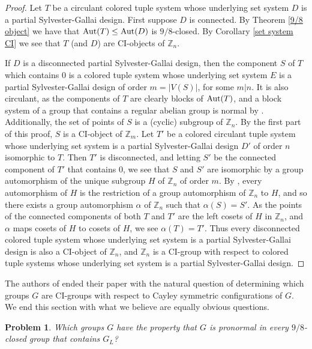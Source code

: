 \documentclass{amsart}
\newtheorem{problem}[thrm]{Problem}
\theoremstyle{definition}
\theoremstyle{remark}
\numberwithin{equation}{section}
\def\Z{{\mathbb Z}}
\def\Aut{{\rm Aut}}
\begin{document}
\begin{proof}
Let $T$ be a circulant colored tuple system whose underlying set system $D$ is a partial Sylvester-Gallai design.  First suppose $D$ is connected.  By Theorem \ref{9/8 object} we have that $\Aut(T)\le\Aut(D)$ is $9/8$-closed.  By Corollary \ref{set system CI} we see that $T$ (and $D$) are CI-objects of $\Z_n$.  %

If $D$ is a disconnected partial Sylvester-Gallai design, then the component $S$ of $T$ which contains $0$ is a colored tuple system whose underlying set system $E$ is a partial Sylvester-Gallai design of order $m = \vert V(S)\vert$, for some $m\vert n$.  It is also circulant, as the components of $T$ are clearly blocks of $\Aut(T)$, and a block system of a group that contains a regular abelian group is normal by \cite[Theorem 2.2.19]{Book}.  Additionally, the set of points of $S$ is a (cyclic) subgroup of $\Z_n$.  By the first part of this proof, $S$ is a CI-object of $\Z_m$.  Let $T'$ be a colored circulant tuple system whose underlying set system is a partial Sylvester-Gallai design $D'$ of order $n$ isomorphic to $T$.  Then $T'$ is disconnected, and letting $S'$ be the connected component of $T'$ that contains $0$, we see that $S$ and $S'$ are isomorphic by a group automorphism of the unique subgroup $H$ of $\Z_n$ of order $m$.  By  \cite{Li1999}, every automorphism of $H$ is the restriction of a group automorphism of $\Z_n$ to $H$, and so there exists a group automorphism $\alpha$ of $\Z_n$ such that $\alpha(S) = S'$.  As the points of the connected components of both $T$ and $T'$ are the left cosets of $H$ in $\Z_n$, and $\alpha$ maps cosets of $H$ to cosets of $H$, we see $\alpha(T) = T'$.  Thus every disconnected colored tuple system whose underlying set system is a partial Sylvester-Gallai design is also a CI-object of $\Z_n$, and $\Z_n$ is a CI-group with respect to colored tuple systems whose underlying set system is a partial Sylvester-Gallai design.
\end{proof}

The authors of \cite{KoikeKMM2019} ended their paper with the natural question of determining which groups $G$ are CI-groups with respect to Cayley symmetric configurations of $G$.  We end this section with what we believe are equally obvious questions.

\begin{problem}
Which groups $G$ have the property that $G$ is pronormal in every $9/8$-closed group that contains $G_L$?
\end{problem}
\end{document}
